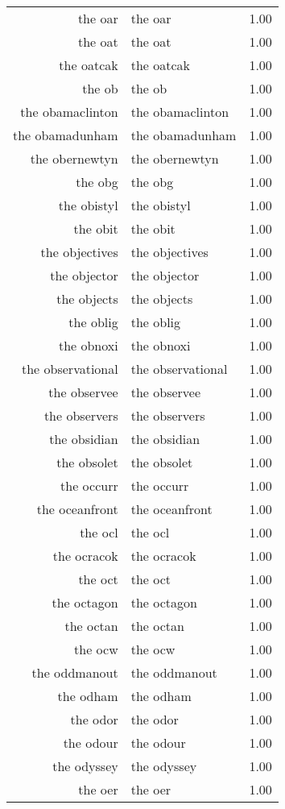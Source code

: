 \begin{table}[ht]
\begin{tabular}{rlr}
  the oar & the oar & 1.00 \\ 
  the oat & the oat & 1.00 \\ 
  the oatcak & the oatcak & 1.00 \\ 
  the ob & the ob & 1.00 \\ 
  the obamaclinton & the obamaclinton & 1.00 \\ 
  the obamadunham & the obamadunham & 1.00 \\ 
  the obernewtyn & the obernewtyn & 1.00 \\ 
  the obg & the obg & 1.00 \\ 
  the obistyl & the obistyl & 1.00 \\ 
  the obit & the obit & 1.00 \\ 
  the objectives & the objectives & 1.00 \\ 
  the objector & the objector & 1.00 \\ 
  the objects & the objects & 1.00 \\ 
  the oblig & the oblig & 1.00 \\ 
  the obnoxi & the obnoxi & 1.00 \\ 
  the observational & the observational & 1.00 \\ 
  the observee & the observee & 1.00 \\ 
  the observers & the observers & 1.00 \\ 
  the obsidian & the obsidian & 1.00 \\ 
  the obsolet & the obsolet & 1.00 \\ 
  the occurr & the occurr & 1.00 \\ 
  the oceanfront & the oceanfront & 1.00 \\ 
  the ocl & the ocl & 1.00 \\ 
  the ocracok & the ocracok & 1.00 \\ 
  the oct & the oct & 1.00 \\ 
  the octagon & the octagon & 1.00 \\ 
  the octan & the octan & 1.00 \\ 
  the ocw & the ocw & 1.00 \\ 
  the oddmanout & the oddmanout & 1.00 \\ 
  the odham & the odham & 1.00 \\ 
  the odor & the odor & 1.00 \\ 
  the odour & the odour & 1.00 \\ 
  the odyssey & the odyssey & 1.00 \\ 
  the oer & the oer & 1.00 \\ 

\end{tabular}
\end{table}

